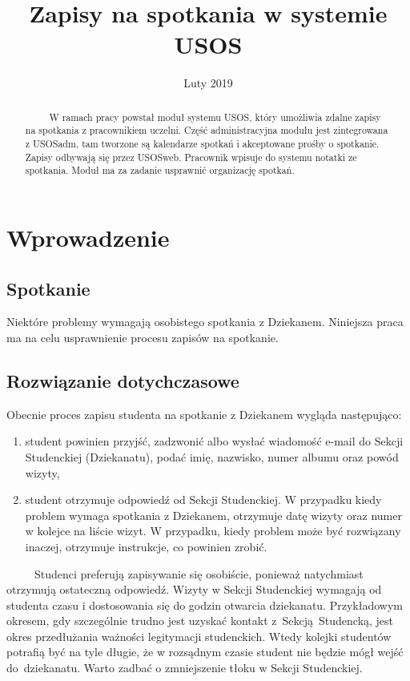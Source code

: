 \documentclass[licencjacka]{pracamgr}
\title{Zapisy na spotkania w systemie USOS}
\date{Luty 2019}
\begin{document}
\maketitle

\begin{abstract}
~~~~~W ramach pracy powstał moduł systemu USOS, który umożliwia zdalne zapisy na spotkania z pracownikiem uczelni. Część administracyjna modułu jest zintegrowana z USOSadm, tam tworzone są kalendarze spotkań i akceptowane prośby o spotkanie. Zapisy odbywają się przez USOSweb. Pracownik wpisuje do systemu notatki ze spotkania. Moduł ma za zadanie usprawnić organizację spotkań.
\end{abstract}

\tableofcontents

\chapter{Wprowadzenie} \label{chap:wpr}
\section{Spotkanie}

Niektóre problemy wymagają osobistego spotkania z Dziekanem. Niniejsza praca ma na celu usprawnienie procesu zapisów na spotkanie.
\section{Rozwiązanie dotychczasowe}
Obecnie proces zapisu studenta na spotkanie z Dziekanem wygląda następująco:
\begin{enumerate}
\item student powinien przyjść, zadzwonić albo wysłać wiadomość e-mail do Sekcji Studenckiej (Dziekanatu), podać imię, nazwisko, numer albumu oraz powód wizyty,
\item student otrzymuje odpowiedź od Sekcji Studenckiej. W przypadku kiedy problem wymaga spotkania z Dziekanem, otrzymuje datę wizyty oraz numer w kolejce na liście wizyt. W przypadku, kiedy problem może być rozwiązany inaczej, otrzymuje instrukcje, co powinien zrobić.
\end{enumerate}
~~~~~Studenci preferują zapisywanie się osobiście, ponieważ natychmiast otrzymują ostateczną odpowiedź. Wizyty w Sekcji Studenckiej wymagają od studenta czasu i dostosowania się do godzin otwarcia dziekanatu. Przykładowym okresem, gdy szczególnie trudno jest uzyskać kontakt z~Sekcją~Studencką, jest okres przedłużania ważności legitymacji studenckich. Wtedy kolejki studentów potrafią być na tyle długie, że w rozsądnym czasie student nie będzie mógł wejść do~dziekanatu. Warto zadbać o zmniejszenie tłoku w Sekcji Studenckiej.
\end{document}
